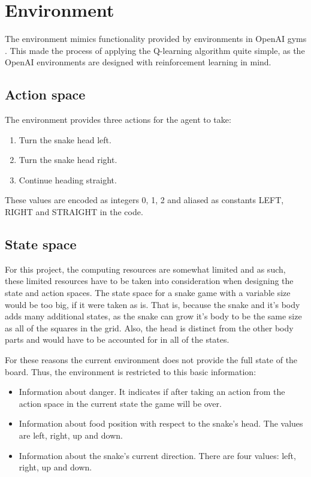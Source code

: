 \documentclass[lettersize,journal]{IEEEtran}
\begin{document}
\section{Environment}
The environment mimics functionality provided by environments in
OpenAI gyms \cite{openai}. This made the process of applying the Q-learning
algorithm quite simple, as the OpenAI environments are designed
with reinforcement learning in mind.

\subsection{Action space}

The environment provides three actions for the agent to take:
\begin{enumerate}
    \item Turn the snake head left.
    \item Turn the snake head right.
    \item Continue heading straight.
\end{enumerate}
These values are encoded as integers 0, 1, 2 and aliased as
constants LEFT, RIGHT and STRAIGHT in the code.


\subsection{State space}
For this project, the computing resources are somewhat limited and
as such, these limited resources have to be taken into consideration
when designing the state and action spaces.
The state space for a snake game with a variable size would be
too big, if it were taken as is. That is, because the snake and
it's body adds many additional states, as the snake can grow it's body to
be the same size as all of the squares in the grid. Also, the head is distinct
from the other body parts and would have to be accounted for in all of the states.

For these reasons the current environment does not provide the full state of the board. Thus, the environment is restricted to
this basic information:
\begin{itemize}
    \item Information about danger. It indicates if after taking an action from the action space in the current state
        the game will be over.
    \item Information about food position with respect to the snake's head. The values are left, right, up and down.
    \item Information about the snake's current direction. There are four values: left, right, up and down.
\end{itemize}
\end{document}
